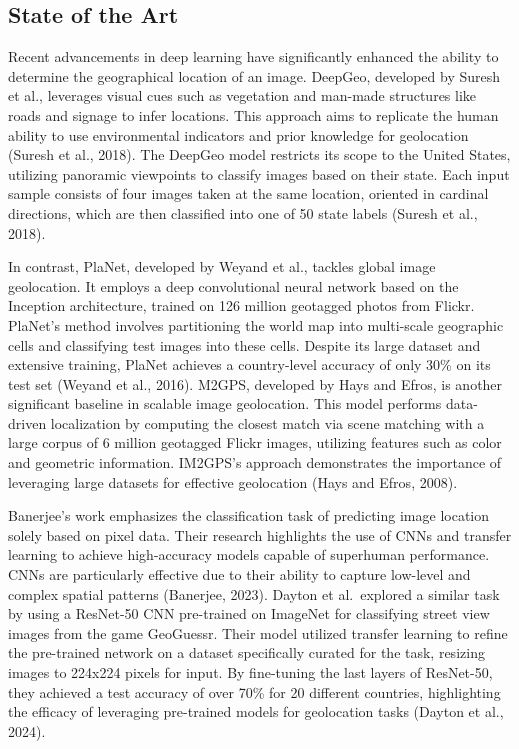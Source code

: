 \documentclass{article}
\begin{document}
\subsection{State of the Art}\label{state-of-the-art}

Recent advancements in deep learning have significantly enhanced the
ability to determine the geographical location of an image. DeepGeo,
developed by Suresh et al., leverages visual cues such as vegetation and
man-made structures like roads and signage to infer locations. This
approach aims to replicate the human ability to use environmental
indicators and prior knowledge for geolocation (Suresh et al., 2018).
The DeepGeo model restricts its scope to the United States, utilizing
panoramic viewpoints to classify images based on their state. Each input
sample consists of four images taken at the same location, oriented in
cardinal directions, which are then classified into one of 50 state
labels (Suresh et al., 2018).

In contrast, PlaNet, developed by Weyand et al., tackles global image
geolocation. It employs a deep convolutional neural network based on the
Inception architecture, trained on 126 million geotagged photos from
Flickr. PlaNet's method involves partitioning the world map into
multi-scale geographic cells and classifying test images into these
cells. Despite its large dataset and extensive training, PlaNet achieves
a country-level accuracy of only 30\% on its test set (Weyand et al.,
2016). M2GPS, developed by Hays and Efros, is another significant
baseline in scalable image geolocation. This model performs data-driven
localization by computing the closest match via scene matching with a
large corpus of 6 million geotagged Flickr images, utilizing features
such as color and geometric information. IM2GPS's approach demonstrates
the importance of leveraging large datasets for effective geolocation
(Hays and Efros, 2008)\hspace{0pt}\hspace{0pt}.

Banerjee's work emphasizes the classification task of predicting image
location solely based on pixel data. Their research highlights the use
of CNNs and transfer learning to achieve high-accuracy models capable of
superhuman performance. CNNs are particularly effective due to their
ability to capture low-level and complex spatial patterns (Banerjee,
2023). Dayton et al.~explored a similar task by using a ResNet-50 CNN
pre-trained on ImageNet for classifying street view images from the game
GeoGuessr. Their model utilized transfer learning to refine the
pre-trained network on a dataset specifically curated for the task,
resizing images to 224x224 pixels for input. By fine-tuning the last
layers of ResNet-50, they achieved a test accuracy of over 70\% for 20
different countries, highlighting the efficacy of leveraging pre-trained
models for geolocation tasks (Dayton et al., 2024).
\end{document}
